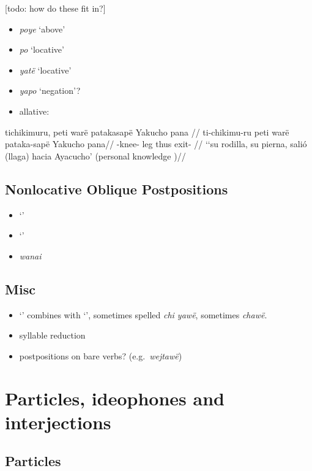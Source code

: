 \documentclass{memoir}
\begin{document}
{[}todo: how do these fit in?{]}

\begin{itemize}
\item
  \emph{poye} `above'
\item
  \emph{po} `locative'
\item
  \emph{yatë} `locative'
\item
  \emph{yapo} `negation'?
\item
  allative:
\end{itemize}

\ex \label{histpajirdi-186}
\begingl \glpreamble tichikimuru, peti warë patakasapë Yakucho pana //
\gla ti-chikimu-ru peti warë pataka-sapë Yakucho pana//
\glb {}-knee- leg thus exit-  //
\glft ‘‘su rodilla, su pierna, salió (llaga) hacia Ayacucho’ (personal knowledge
)//
\endgl
\xe

\section{Nonlocative Oblique Postpositions}

\begin{itemize}
\tightlist
\item
   `'
\item
   `'
\item
  \emph{wanai}
\end{itemize}

\section{Misc}

\begin{itemize}
\tightlist
\item
   `' combines with  `', sometimes
  spelled \emph{chi yawë}, sometimes \emph{chawë}.
\item
  syllable reduction
\item
  postpositions on bare verbs? (e.g.~\emph{wejtawë})
\end{itemize}

\chapter{\texorpdfstring{Particles, ideophones and interjections
\label{partideo}}{Particles, ideophones and interjections }}

\section{Particles}
\end{document}
